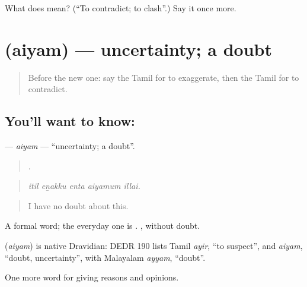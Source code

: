 \begin{tcolorbox}[breakable,colback=teal!4,colframe=teal!35!black,title={Before you move on}]
What does  mean? (\textquotedblleft{}To contradict; to clash\textquotedblright{}.) Say it once more.
\end{tcolorbox}
\section[\texorpdfstring{\ta{ஐயம்} (aiyam)}{ஐயம் (aiyam)}]{ (aiyam) — uncertainty; a doubt}

\label{lesson:TA-C359-aiyam}



\begin{quote}
Before the new one: say the Tamil for to exaggerate, then the Tamil for to contradict.
\end{quote}

\subsection*{You'll want to know: }
\textbf{} — \emph{aiyam} — \textquotedblleft{}uncertainty; a doubt\textquotedblright{}.

\begin{quote}
    .
\end{quote}

\begin{quote}
\emph{itil eṉakku enta aiyamum illai.}
\end{quote}

\begin{quote}
I have no doubt about this.
\end{quote}

A formal word; the everyday one is . , without doubt.

\begin{cousinweb}
\textbf{} (\emph{aiyam}) is native Dravidian: DEDR 190 lists Tamil \emph{ayir}, \textquotedblleft{}to suspect\textquotedblright{}, and \emph{aiyam}, \textquotedblleft{}doubt, uncertainty\textquotedblright{}, with Malayalam \emph{ayyam}, \textquotedblleft{}doubt\textquotedblright{}.
\end{cousinweb}

\begin{grammarlens}[title={What you've built}]
One more word for giving reasons and opinions.
\end{grammarlens}


